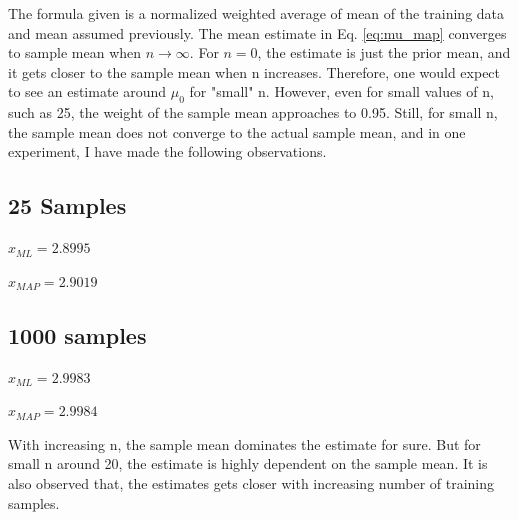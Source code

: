 \documentclass[11pt]{extarticle}
\begin{document}
The formula given is a normalized weighted average of mean of the training data and mean assumed previously.
The mean estimate in Eq. \ref{eq:mu_map} converges to sample mean when $n \rightarrow \infty$. For $n=0$, the
estimate is just the prior mean, and it gets closer to the sample mean when n increases. Therefore, one would expect to see an
estimate around $\mu_0$ for "small" n. However,
even for small values of n, such as 25, the weight of the sample mean approaches to 0.95.  Still, for small n,
the sample mean does not converge to the actual sample mean, and in one experiment, I have made the following observations.

\subsection{25 Samples}
\begin{minipage}{0.3\textwidth}
    ${\hat{x}}_{ML} = 2.8995$
\end{minipage}
\begin{minipage}{0.6\textwidth}
    ${\hat{x}}_{MAP} = 2.9019$
\end{minipage}

\subsection{1000 samples}
\begin{minipage}{0.3\textwidth}
    ${\hat{x}}_{ML} = 2.9983$
\end{minipage}
\begin{minipage}{0.6\textwidth}
    ${\hat{x}}_{MAP} = 2.9984$
\end{minipage}
\vspace*{0.5cm}

With increasing n, the sample mean dominates the estimate for sure.
But for small n around 20, the estimate is highly dependent on the sample mean.
It is also observed that, the estimates gets closer with increasing number of training samples.
\end{document}
